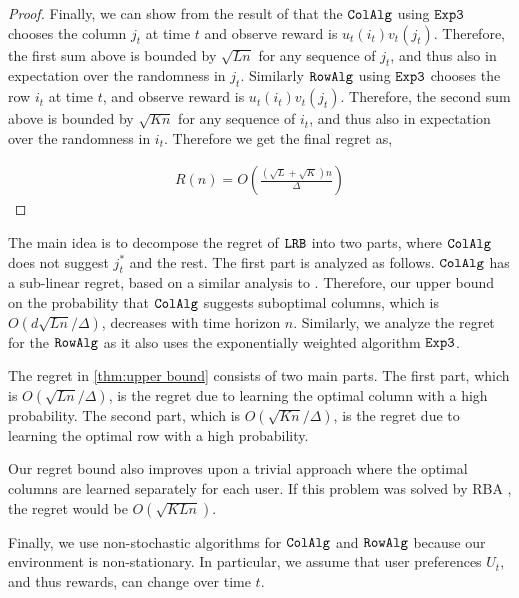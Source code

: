 \begin{proof}
Finally, we can show from the result of \citet{auer2002nonstochastic} that the ${\tt ColAlg}$ using ${\tt Exp3}$ chooses the column $j_t$ at time $t$ and observe reward is $u_t(i_t) v_t(j_t)$. Therefore, the first sum above is bounded by $\sqrt{L n}$ for any sequence of $j_t$, and thus also in expectation over the randomness in $j_t$. Similarly ${\tt RowAlg}$ using ${\tt Exp3}$ chooses the row $i_t$ at time $t$, and observe reward is $u_t(i_t) v_t(j_t)$. Therefore, the second sum above is bounded by $\sqrt{K n}$ for any sequence of $i_t$, and thus also in expectation over the randomness in $i_t$. Therefore we get the final regret as,

\begin{align*}
  R(n) = O\left(\frac{\left(\sqrt{L } + \sqrt{K }\right)n}{\Delta}\right)
\end{align*}
\end{proof}


\begin{discussion}
The main idea is to decompose the regret of ${\tt LRB}$ into two parts, where ${\tt ColAlg}$ does not suggest $j^*_t$ and the rest. The first part is analyzed as follows. ${\tt ColAlg}$ has a sub-linear regret, based on a similar analysis to \citet{auer2002nonstochastic}. Therefore, our upper bound on the probability that ${\tt ColAlg}$ suggests suboptimal columns, which is $O(d \sqrt{L n} / \Delta)$, decreases with time horizon $n$. Similarly, we analyze the regret for the ${\tt RowAlg}$ as it also uses the exponentially weighted algorithm ${\tt Exp3}$.


The regret in \cref{thm:upper bound} consists of two main parts. The first part, which is $O(\sqrt{L n} / \Delta)$, is the regret due to learning the optimal column with a high probability. The second part, which is $O(\sqrt{K n} / \Delta)$, is the regret due to learning the optimal row with a high probability.

Our regret bound also improves upon a trivial approach where the optimal columns are learned separately for each user. If this problem was solved by RBA \citep{radlinski2008learning}, the regret would be $O(\sqrt{K L n})$.

Finally, we use non-stochastic algorithms for ${\tt ColAlg}$ and ${\tt RowAlg}$ because our environment is non-stationary. In particular, we assume that user preferences $U_t$, and thus rewards, can change over time $t$. 
\end{discussion}